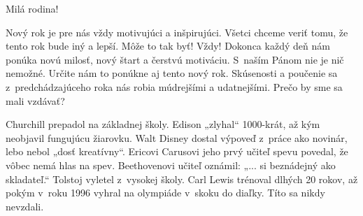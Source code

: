








Milá rodina!

Nový rok je pre nás vždy motivujúci a inšpirujúci. Všetci chceme veriť tomu, že tento rok bude iný a lepší. Môže to tak byť! Vždy! Dokonca každý deň nám ponúka novú milosť, nový štart a čerstvú motiváciu. S~naším Pánom nie je nič nemožné. Určite nám to ponúkne aj tento nový rok. Skúsenosti a poučenie sa z~predchádzajúceho roka nás robia múdrejšími a udatnejšími. Prečo by sme sa mali vzdávať?

Churchill prepadol na základnej školy. Edison „zlyhal“ 1000-krát, až kým neobjavil fungujúcu žiarovku. Walt Disney dostal výpoveď z~práce ako novinár, lebo nebol „dosť kreatívny“. Ericovi Carusovi jeho prvý učiteľ spevu povedal, že vôbec nemá hlas na spev. Beethovenovi učiteľ oznámil: „... si beznádejný ako skladateľ.“ Tolstoj vyletel z~vysokej školy. Carl Lewis trénoval dlhých 20 rokov, až pokým v~roku 1996 vyhral na olympiáde v~skoku do diaľky. Títo sa nikdy nevzdali.

